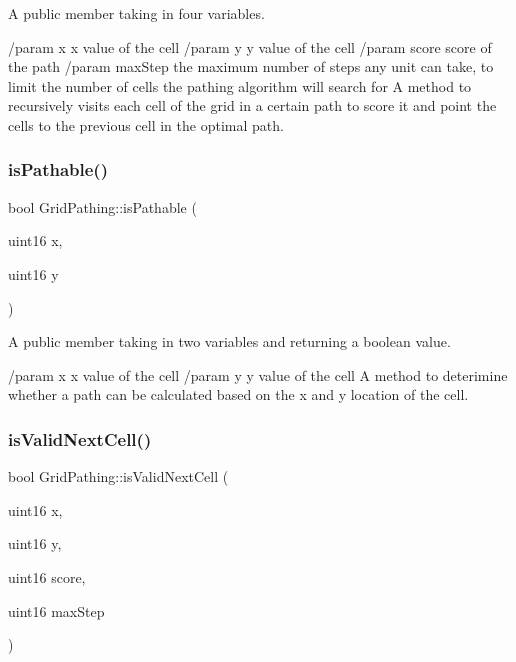 A public member taking in four variables. 

/param x x value of the cell /param y y value of the cell /param score score of the path /param max\+Step the maximum number of steps any unit can take, to limit the number of cells the pathing algorithm will search for A method to recursively visits each cell of the grid in a certain path to score it and point the cells to the previous cell in the optimal path. \hypertarget{class_grid_pathing_a037817191233010bfb337e78142583b3}{}\label{class_grid_pathing_a037817191233010bfb337e78142583b3} 
\subsubsection{\texorpdfstring{is\+Pathable()}{isPathable()}}
{\footnotesize\ttfamily bool Grid\+Pathing\+::is\+Pathable (\begin{DoxyParamCaption}\item[{uint16}]{x,  }\item[{uint16}]{y }\end{DoxyParamCaption})}



A public member taking in two variables and returning a boolean value. 

/param x x value of the cell /param y y value of the cell A method to deterimine whether a path can be calculated based on the x and y location of the cell. \hypertarget{class_grid_pathing_a97cdae33476da7638fbcd45fc0595eb9}{}\label{class_grid_pathing_a97cdae33476da7638fbcd45fc0595eb9} 
\subsubsection{\texorpdfstring{is\+Valid\+Next\+Cell()}{isValidNextCell()}}
{\footnotesize\ttfamily bool Grid\+Pathing\+::is\+Valid\+Next\+Cell (\begin{DoxyParamCaption}\item[{uint16}]{x,  }\item[{uint16}]{y,  }\item[{uint16}]{score,  }\item[{uint16}]{max\+Step }\end{DoxyParamCaption})}



